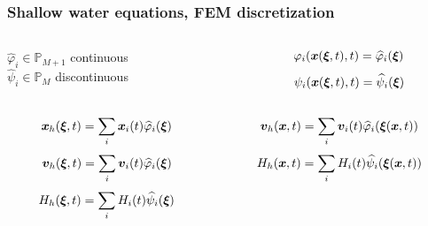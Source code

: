 \documentclass[pt12]{beamer}
\newcommand{\uvec}[2][3]{\boldsymbol{#2\mkern-#1mu}\mkern#1mu}
\newcommand{\hphi}[0]{\widehat{\varphi}}
\newcommand{\hpsi}[0]{\widehat{\psi}}
\begin{document}
\begin{frame}
\frametitle{Shallow water equations, FEM discretization}

    \begin{columns}

        \begin{column}{0.50\textwidth}
\quad $\hphi_i\in \mathbb{P}_{M+1}$ continuous\\
\quad $\hpsi_i\in \mathbb{P}_{M}$ \quad discontinuous
        \end{column}
        \begin{column}{0.50\textwidth}
$$\varphi_i(\uvec{x}(\uvec{\xi},t),t)=\hphi_i(\uvec{\xi})$$
$$\psi_i(\uvec{x}(\uvec{\xi},t),t)=\hpsi_i(\uvec{\xi})$$
        \end{column}
    \end{columns}

\vspace{1cm}

    \begin{columns}

        \begin{column}{0.50\textwidth}
$$\uvec{x}_h(\uvec{\xi},t)=\sum_i\uvec{x}_i(t)\hphi_i(\uvec{\xi})$$
$$\uvec{v}_h(\uvec{\xi},t)=\sum_i\uvec{v}_i(t)\hphi_i(\uvec{\xi})$$
$$H_h(\uvec{\xi},t)=\sum_i H_i(t)\hpsi_i(\uvec{\xi})$$
        \end{column}
        \begin{column}{0.50\textwidth}
$$\uvec{v}_h(\uvec{x},t)=\sum_i\uvec{v}_i(t)\hphi_i(\uvec{\xi}(\uvec{x},t))$$
$$H_h(\uvec{x},t)=\sum_i H_i(t)\hpsi_i(\uvec{\xi}(\uvec{x},t))$$
        \end{column}
    \end{columns}


\end{frame}
\end{document}
